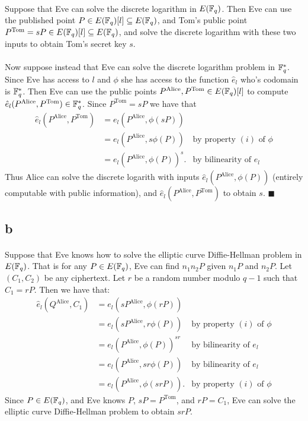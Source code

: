 \documentclass[letterpaper,12pt,oneside,onecolumn]{article}
\begin{document}
\paragraph{}
Suppose that Eve can solve the discrete logarithm in $E(\mathbb{F}_q)$. Then Eve can use the published point $P \in E(\mathbb{F}_q)[l] \subseteq E(\mathbb{F}_q)$, and Tom's public point $P^{\text{Tom}} = sP \in E(\mathbb{F}_q)[l] \subseteq E(\mathbb{F}_q)$, and solve the discrete logarithm with these two inputs to obtain Tom's secret key $s$.
\paragraph{}
Now suppose instead that Eve can solve the discrete logarithm problem in $\mathbb{F}_q^*$. Since Eve has access to $l$ and $\phi$ she has access to the function $\hat{e}_l$ who's codomain is $\mathbb{F}_q^*$. Then Eve can use the public points $P^\text{Alice}, P^{\text{Tom}} \in E(\mathbb{F}_q)[l]$ to compute $\hat{e}_l(P^\text{Alice}, P^{\text{Tom}}) \in \mathbb{F}_q^*$. Since $P^{\text{Tom}} = sP$ we have that 
\begin{align*}
\hat{e}_l(P^\text{Alice}, P^{\text{Tom}}) &= e_l(P^\text{Alice}, \phi(sP))\\
&= e_l(P^\text{Alice}, s\phi(P)) &\text{by property $(i)$ of $\phi$} \\
&= e_l(P^\text{Alice},\phi(P))^s. &\text{by bilinearity of $e_l$}
\end{align*}
Thus Alice can solve the discrete logarith with inputs $\hat{e}_l(P^\text{Alice},\phi(P))$ (entirely computable with public information), and $\hat{e}_l(P^\text{Alice}, P^{\text{Tom}})$ to obtain $s$. $\blacksquare$
\subsection*{b}
\paragraph{}
Suppose that Eve knows how to solve the elliptic curve Diffie-Hellman problem in $E(\mathbb{F}_q)$. That is for any $P \in E(\mathbb{F}_q)$, Eve can find $n_1n_2P$ given $n_1P$ and $n_2P$. Let $(C_1, C_2)$ be any ciphertext. Let $r$ be a random number modulo $q-1$ such that $C_1 = rP$. Then we have that:
\begin{align*}
\hat{e}_l (Q^\text{Alice}, C_1) &= e_l(sP^\text{Alice}, \phi(rP)) \\
&= e_l(sP^\text{Alice}, r\phi(P)) &\text{by property $(i)$ of $\phi$}\\
&=e_l(P^\text{Alice}, \phi(P))^{sr} &\text{by bilinearity of $e_l$}\\
&=e_l(P^\text{Alice},sr\phi(P)) &\text{by bilinearity of $e_l$}\\
&=e_l(P^\text{Alice},\phi(srP)). &\text{by property $(i)$ of $\phi$}
\end{align*}
Since $P \in E(\mathbb{F}_q)$, and Eve knows $P$, $sP = P^\text{Tom}$, and $rP = C_1$, Eve can solve the elliptic curve Diffie-Hellman problem to obtain $srP$.
\end{document}

